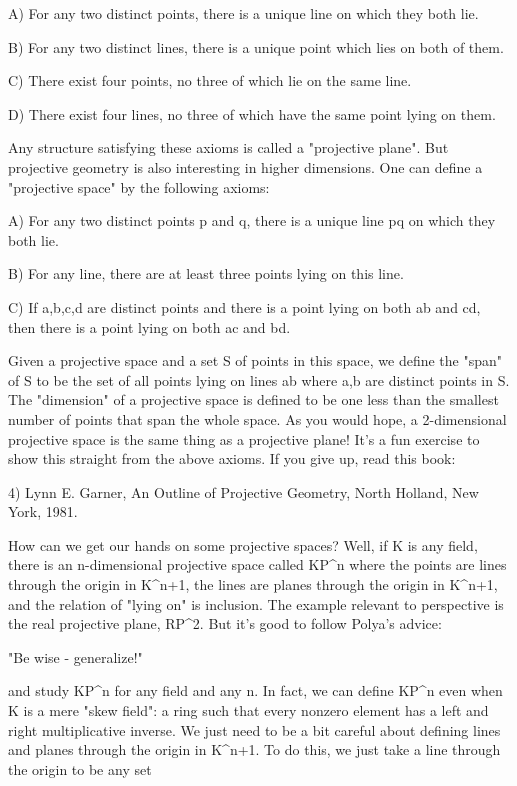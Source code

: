 A) For any two distinct points, there is a unique line on which they
both lie.

B) For any two distinct lines, there is a unique point which lies on
both of them.

C) There exist four points, no three of which lie on the same line.

D) There exist four lines, no three of which have the same point lying
on them.  

Any structure satisfying these axioms is called a "projective plane".
But projective geometry is also interesting in higher dimensions.  One
can define a "projective space" by the following axioms:

A) For any two distinct points p and q, there is a unique line
pq on which they both lie.

B) For any line, there are at least three points lying on this line.

C) If a,b,c,d are distinct points and there is a point lying
on both ab and cd, then there is a point lying on both ac and bd.


Given a projective space and a set S of points in this space, we define
the "span" of S to be the set of all points lying on lines ab
where a,b are distinct points in S.  The "dimension" of a
projective space is defined to be one less than the smallest number of
points that span the whole space.  As you would hope, a 2-dimensional
projective space is the same thing as a projective plane!  It's a fun
exercise to show this straight from the above axioms.  If you give up,
read this book:

4) Lynn E. Garner, An Outline of Projective Geometry, North Holland, New
York, 1981.

How can we get our hands on some projective spaces?  Well, if K is any
field, there is an n-dimensional projective space called
KP^{n} where the points are lines through the origin in
K^{n+1}, the lines are planes through the origin in K^{n+1},
and the relation of "lying on" is inclusion.  The example
relevant to perspective is the real projective plane, RP^{2}.
But it's good to follow Polya's advice:

"Be wise - generalize!" 

and study KP^{n} for any field and any n.  In fact, we can
define KP^{n} even when K is a mere "skew field": a
ring such that every nonzero element has a left and right
multiplicative inverse.  We just need to be a bit careful about
defining lines and planes through the origin in K^{n+1}.  To
do this, we just take a line through the origin to be any set


